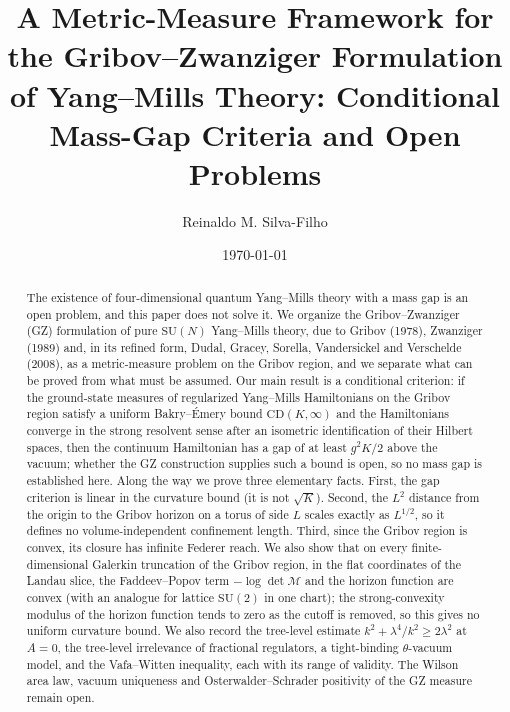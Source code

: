 \documentclass[11pt,a4paper]{amsart}
\theoremstyle{definition}
\begin{document}
\title[Gribov--Zwanziger Metric-Measure Framework]{A Metric-Measure Framework for the Gribov--Zwanziger Formulation of Yang--Mills Theory: Conditional Mass-Gap Criteria and Open Problems}

\author{Reinaldo M. Silva-Filho}
\address{Master's student, Postgraduate Program in Statistics and Agricultural Experimentation (PPGEE/DES), \\
Department of Statistics (DES), \\
Federal University of Lavras (UFLA), Lavras, MG, Brazil}

\date{\today}

\begin{abstract}
The existence of four-dimensional quantum Yang--Mills theory with a mass gap is an open problem, and this paper does not solve it. We organize the Gribov--Zwanziger (GZ) formulation of pure $\mathrm{SU}(N)$ Yang--Mills theory, due to Gribov (1978), Zwanziger (1989) and, in its refined form, Dudal, Gracey, Sorella, Vandersickel and Verschelde (2008), as a metric-measure problem on the Gribov region, and we separate what can be proved from what must be assumed. Our main result is a conditional criterion: if the ground-state measures of regularized Yang--Mills Hamiltonians on the Gribov region satisfy a uniform Bakry--\'Emery bound $\mathrm{CD}(K,\infty)$ and the Hamiltonians converge in the strong resolvent sense after an isometric identification of their Hilbert spaces, then the continuum Hamiltonian has a gap of at least $g^2K/2$ above the vacuum; whether the GZ construction supplies such a bound is open, so no mass gap is established here. Along the way we prove three elementary facts. First, the gap criterion is linear in the curvature bound (it is not $\sqrt{K}$). Second, the $L^2$ distance from the origin to the Gribov horizon on a torus of side $L$ scales exactly as $L^{1/2}$, so it defines no volume-independent confinement length. Third, since the Gribov region is convex, its closure has infinite Federer reach. We also show that on every finite-dimensional Galerkin truncation of the Gribov region, in the flat coordinates of the Landau slice, the Faddeev--Popov term $-\log\det\mathcal{M}$ and the horizon function are convex (with an analogue for lattice $\mathrm{SU}(2)$ in one chart); the strong-convexity modulus of the horizon function tends to zero as the cutoff is removed, so this gives no uniform curvature bound. We also record the tree-level estimate $k^2+\lambda^4/k^2\ge 2\lambda^2$ at $A=0$, the tree-level irrelevance of fractional regulators, a tight-binding $\theta$-vacuum model, and the Vafa--Witten inequality, each with its range of validity. The Wilson area law, vacuum uniqueness and Osterwalder--Schrader positivity of the GZ measure remain open.
\end{abstract}
\end{document}
